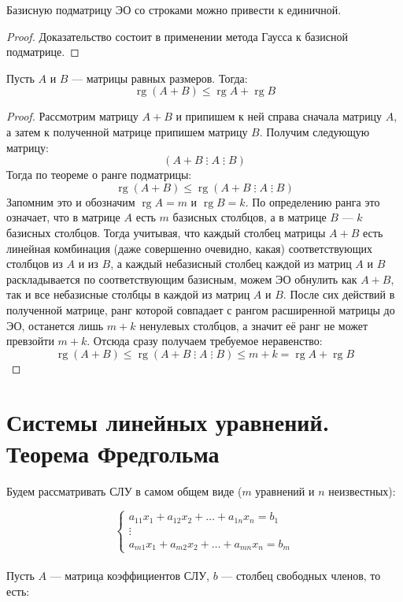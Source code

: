 \documentclass[11pt]{article}
\DeclareMathOperator{\rg}{rg}
\begin{document}
\begin{theorem}
    Базисную подматрицу ЭО со строками можно привести к единичной.
\end{theorem}

\begin{proof}
    Доказательство состоит в применении метода Гаусса к базисной подматрице.
\end{proof}

\begin{lemma}
    Пусть $A$ и $B$ --- матрицы равных размеров. Тогда:
    \[\rg \left(A + B\right) \leq \rg A + \rg B\]
\end{lemma}

\begin{proof}
    Рассмотрим матрицу $A + B$ и припишем к ней справа сначала матрицу $A$, а затем к полученной матрице 
    припишем матрицу $B$. Получим следующую матрицу:
    \[\left(A + B \; \vdots \; A \; \vdots \; B\right)\]
    Тогда по теореме о ранге подматрицы:
    \[\rg \left(A + B\right) \leq \rg \left(A + B \; \vdots \; A \; \vdots \; B\right)\]
    Запомним это и обозначим $\rg A = m$ и $\rg B = k$. По определению ранга это означает, что 
    в матрице $A$ есть $m$ базисных столбцов, а в матрице $B$ --- $k$ базисных столбцов. Тогда учитывая, что 
    каждый столбец матрицы $A + B$ есть линейная комбинация (даже совершенно очевидно, какая) соответствующих столбцов из $A$ и из $B$, а 
    каждый небазисный столбец каждой из матриц $A$ и $B$ раскладывается по соответствующим базисным, можем ЭО обнулить как $A + B$, так и 
    все небазисные столбцы в каждой из матриц $A$ и $B$. После сих действий в полученной матрице, ранг которой совпадает с рангом расширенной матрицы до ЭО,
    останется лишь $m + k$ ненулевых столбцов, а значит её ранг не может превзойти $m + k$. Отсюда сразу получаем требуемое неравенство:
    \[\rg \left(A + B\right) \leq \rg \left(A + B \; \vdots \; A \; \vdots \; B\right) \leq m + k = \rg A + \rg B\]
\end{proof}

\section{Системы линейных уравнений. Теорема Фредгольма}

Будем рассматривать СЛУ в самом общем виде ($m$ уравнений и $n$ неизвестных):

\begin{equation*}
    \begin{cases}
        a_{11} x_1 + a_{12} x_2 + \ldots + a_{1n} x_n = b_1 \\
        \vdots\\
        a_{m1} x_1 + a_{m2} x_2 + \ldots + a_{mn} x_n = b_m
    \end{cases}
\end{equation*} \leavevmode
\\
Пусть $A$ --- матрица коэффициентов СЛУ, $b$ --- столбец свободных членов, то есть:
\end{document}
